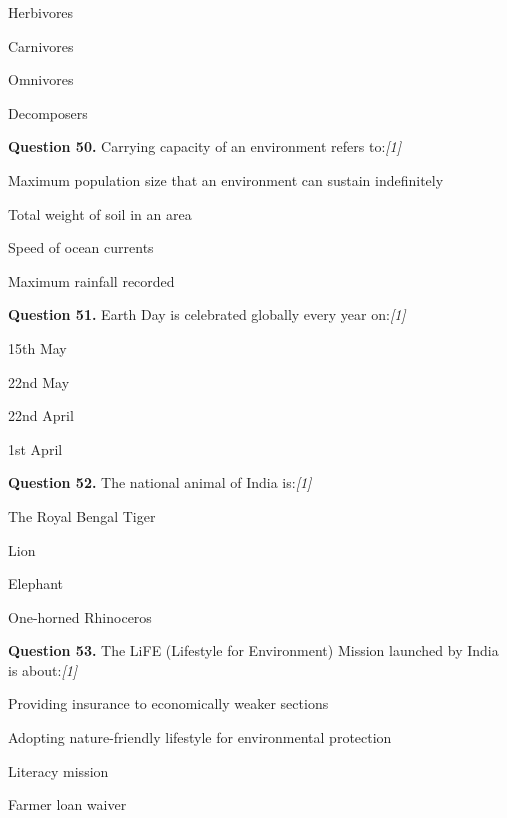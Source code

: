 \documentclass[11pt,a4paper]{article}
\newcommand{\pts}[1]{\hfill   \textit{[#1]}}
\begin{document}
\begin{parts}
  \item Herbivores
  \item Carnivores
  \item Omnivores
  \item Decomposers
\end{parts}

\medskip


\noindent   \textbf{Question 50.} Carrying capacity of an environment refers to:\pts{1}

\begin{parts}
  \item Maximum population size that an environment can sustain indefinitely
  \item Total weight of soil in an area
  \item Speed of ocean currents
  \item Maximum rainfall recorded
\end{parts}

\medskip


\noindent   \textbf{Question 51.} Earth Day is celebrated globally every year on:\pts{1}

\begin{parts}
  \item 15th May
  \item 22nd May
  \item 22nd April
  \item 1st April
\end{parts}

\medskip


\noindent   \textbf{Question 52.} The national animal of India is:\pts{1}

\begin{parts}
  \item The Royal Bengal Tiger
  \item Lion
  \item Elephant
  \item One-horned Rhinoceros
\end{parts}

\medskip


\noindent   \textbf{Question 53.} The LiFE (Lifestyle for Environment) Mission launched by India is about:\pts{1}

\begin{parts}
  \item Providing insurance to economically weaker sections
  \item Adopting nature-friendly lifestyle for environmental protection
  \item Literacy mission
  \item Farmer loan waiver
\end{parts}
\end{document}

